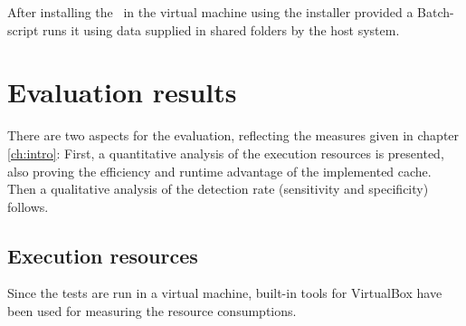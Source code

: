 After installing the \vd~in the virtual machine using the installer provided a Batch-script runs it using data supplied in shared folders by the host system.

\section{Evaluation results}\label{sec:eval-results}

There are two aspects for the evaluation, reflecting the measures given in chapter \ref{ch:intro}: First, a quantitative analysis of the execution resources is presented, also proving the efficiency and runtime advantage of the implemented cache. Then a qualitative analysis of the detection rate (sensitivity and specificity) follows.

\subsection{Execution resources}

Since the tests are run in a virtual machine, built-in tools for VirtualBox have been used for measuring the resource consumptions.

